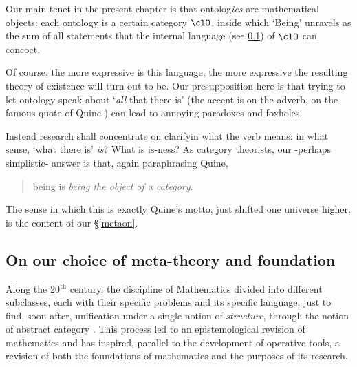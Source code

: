 Our main tenet in the present chapter is that ontolog\emph{ies} are mathematical objects: each ontology is a certain category $\clO$, inside which `Being' unravels as the sum of all statements that the internal language (see \ref{}) of $\clO$ can concoct. 

Of course, the more expressive is this language, the more expressive the resulting theory of existence will turn out to be. Our presupposition here is that trying to let ontology speak about `\emph{all} that there is' (the accent is on the adverb, on the famous quote of Quine \cite{}) can lead to annoying paradoxes and foxholes.

Instead research shall concentrate on clarifyin what the verb means: in what sense, `what there is' \emph{is}? What is is-ness? As category theorists, our -perhaps simplistic- answer is that, again paraphrasing Quine, 
\begin{quote}
being is \emph{being the object of a category}.
\end{quote}
The sense in which this is exactly Quine's motto, just shifted one universe higher, is the content of our §\ref{metaon}.
\subsection{On our choice of meta-theory and foundation}
Along the 20$^\text{th}$ century, the discipline of Mathematics divided into different subclasses, each with their specific problems and its specific language, just to find, soon after, unification under a single notion of \emph{structure}, through the notion of abstract category \cite{gtone}. This process led to an epistemological revision of mathematics and has inspired, parallel to the development of operative tools, a revision of both the foundations of mathematics and the purposes of its research. 

